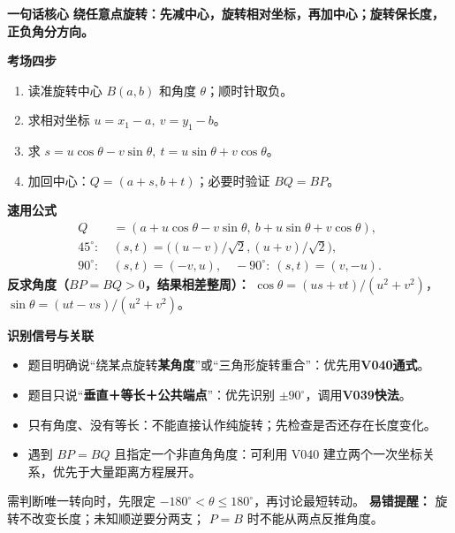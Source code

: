 \begin{summarybox}
  \textbf{\textcolor{CSummary}{一句话核心}}
  \textbf{绕任意点旋转：先减中心，旋转相对坐标，再加中心；旋转保长度，正负角分方向。}

  \medskip
  \textbf{\textcolor{CSummary}{考场四步}}
  \begin{enumerate}[leftmargin=*,itemsep=0.28em]
    \item 读准旋转中心 $B(a,b)$ 和角度 $\theta$；顺时针取负。
    \item 求相对坐标 $u=x_1-a,\ v=y_1-b$。
    \item 求 $s=u\cos\theta-v\sin\theta,\ t=u\sin\theta+v\cos\theta$。
    \item 加回中心：$\boxed{Q=(a+s,b+t)}$；必要时验证 $BQ=BP$。
  \end{enumerate}

  \medskip
  \textbf{\textcolor{CSummary}{速用公式}}
  \[
  \boxed{\begin{aligned}
    Q&=(a+u\cos\theta-v\sin\theta,\ b+u\sin\theta+v\cos\theta),\\[-1pt]
    45^\circ:\ &(s,t)=\bigl((u-v)/\sqrt2,(u+v)/\sqrt2\bigr),\\
    90^\circ:\ &(s,t)=(-v,u),\quad
    -90^\circ:\ (s,t)=(v,-u).
  \end{aligned}}
  \]
  \textbf{反求角度（$BP=BQ>0$，结果相差整周）：} $\cos\theta=(us+vt)/(u^2+v^2)$，$\sin\theta=(ut-vs)/(u^2+v^2)$。

  \medskip
  \textbf{\textcolor{CSummary}{识别信号与关联}}
  \begin{itemize}[leftmargin=*,itemsep=0.3em]
    \item 题目明确说“绕某点旋转\textbf{某角度}”或“三角形旋转重合”：优先用\textbf{V040通式}。
    \item 题目只说“\textbf{垂直＋等长＋公共端点}”：优先识别 $\pm90^\circ$，调用\textbf{V039快法}。
    \item 只有角度、没有等长：不能直接认作纯旋转；先检查是否还存在长度变化。
    \item 遇到 $BP=BQ$ 且指定一个非直角角度：可利用 V040 建立两个一次坐标关系，优先于大量距离方程展开。
  \end{itemize}
  需判断唯一转向时，先限定 $-180^\circ<\theta\le180^\circ$，再讨论最短转动。
  \textbf{易错提醒：} 旋转不改变长度；未知顺逆要分两支； $P=B$ 时不能从两点反推角度。
\end{summarybox}
